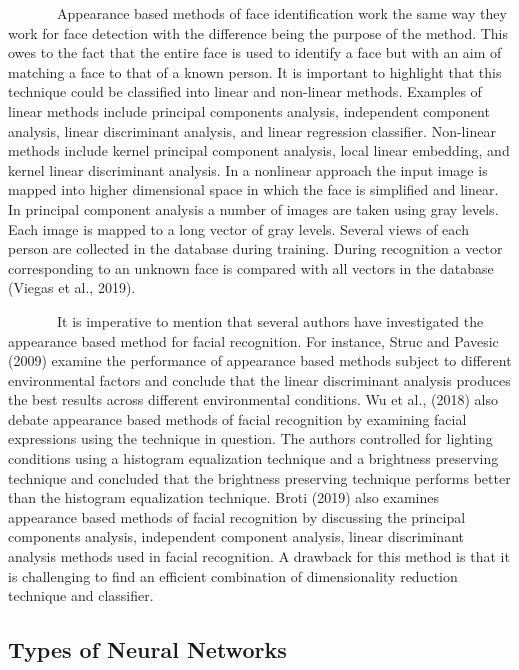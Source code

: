 \documentclass[
  12pt,
]{article}
\begin{document}
~~~~~~~Appearance based methods of face identification work the same way
they work for face detection with the difference being the purpose of
the method. This owes to the fact that the entire face is used to
identify a face but with an aim of matching a face to that of a known
person. It is important to highlight that this technique could be
classified into linear and non-linear methods. Examples of linear
methods include principal components analysis, independent component
analysis, linear discriminant analysis, and linear regression
classifier. Non-linear methods include kernel principal component
analysis, local linear embedding, and kernel linear discriminant
analysis. In a nonlinear approach the input image is mapped into higher
dimensional space in which the face is simplified and linear. In
principal component analysis a number of images are taken using gray
levels. Each image is mapped to a long vector of gray levels. Several
views of each person are collected in the database during training.
During recognition a vector corresponding to an unknown face is compared
with all vectors in the database (Viegas et al., 2019).

~~~~~~~It is imperative to mention that several authors have
investigated the appearance based method for facial recognition. For
instance, Struc and Pavesic (2009) examine the performance of appearance
based methods subject to different environmental factors and conclude
that the linear discriminant analysis produces the best results across
different environmental conditions. Wu et al., (2018) also debate
appearance based methods of facial recognition by examining facial
expressions using the technique in question. The authors controlled for
lighting conditions using a histogram equalization technique and a
brightness preserving technique and concluded that the brightness
preserving technique performs better than the histogram equalization
technique. Broti (2019) also examines appearance based methods of facial
recognition by discussing the principal components analysis, independent
component analysis, linear discriminant analysis methods used in facial
recognition. A drawback for this method is that it is challenging to
find an efficient combination of dimensionality reduction technique and
classifier.

\subsection{Types of Neural Networks}\label{types-of-neural-networks}
\end{document}
